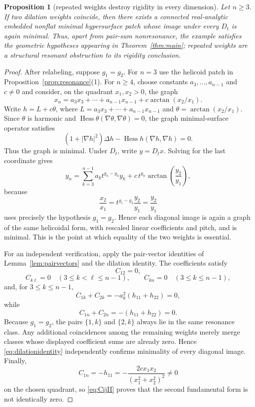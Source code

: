 \documentclass[10pt,a4paper]{amsart}
\newtheorem{proposition}{Proposition}
\begin{document}
\begin{proposition}[repeated weights destroy rigidity in every dimension]\label{prop:repeatedweights}
Let $n\ge3$. If two dilation weights coincide, then there exists a connected real-analytic embedded nonflat minimal hypersurface patch whose image under every $D_t$ is again minimal. Thus, apart from pair-sum nonresonance, the example satisfies the geometric hypotheses appearing in Theorem~\ref{thm:main}; repeated weights are a structural resonant obstruction to its rigidity conclusion.
\end{proposition}

\begin{proof}
After relabeling, suppose $g_1=g_2$. For $n=3$ use the helicoid patch in Proposition~\ref{prop:resonance}(1). For $n\ge4$, choose constants $a_3,\ldots,a_{n-1}$ and $c\ne0$ and consider, on the quadrant $x_1,x_2>0$, the graph
\begin{equation}\label{eq:shearedhelicoid}
x_n=a_3x_3+\cdots+a_{n-1}x_{n-1}+c\arctan(x_2/x_1).
\end{equation}
Write $h=L+c\theta$, where $L=a_3x_3+\cdots+a_{n-1}x_{n-1}$ and $\theta=\arctan(x_2/x_1)$. Since $\theta$ is harmonic and $\operatorname{Hess}\theta(\nabla\theta,\nabla\theta)=0$, the graph minimal-surface operator satisfies
\[
(1+|\nabla h|^2)\Delta h-\operatorname{Hess}h(\nabla h,\nabla h)=0.
\]
Thus the graph is minimal. Under $D_t$, write $y=D_tx$. Solving for the last coordinate gives
\[
y_n=\sum_{k=3}^{n-1}a_k t^{g_n-g_k}y_k+c\,t^{g_n}\arctan\!\left(\frac{y_2}{y_1}\right),
\]
because
\[
\frac{x_2}{x_1}=t^{g_1-g_2}\frac{y_2}{y_1}=\frac{y_2}{y_1}
\]
uses precisely the hypothesis $g_1=g_2$. Hence each diagonal image is again a graph of the same helicoidal form, with rescaled linear coefficients and pitch, and is minimal. This is the point at which equality of the two weights is essential.

For an independent verification, apply the pair-vector identities of Lemma~\ref{lem:pairvectors} and the dilation identity. The coefficients satisfy
\[
C_{12}=0,
\]
\[
C_{k\ell}=0\quad(3\le k<\ell\le n-1),\qquad
C_{kn}=0\quad(3\le k\le n-1),
\]
and, for $3\le k\le n-1$,
\[
C_{1k}+C_{2k}=-a_k^2(h_{11}+h_{22})=0,
\]
while
\[
C_{1n}+C_{2n}=-(h_{11}+h_{22})=0.
\]
Because $g_1=g_2$, the pairs $\{1,k\}$ and $\{2,k\}$ always lie in the same resonance class. Any additional coincidences among the remaining weights merely merge classes whose displayed coefficient sums are already zero. Hence \eqref{eq:dilationidentity} independently confirms minimality of every diagonal image. Finally,
\[
C_{1n}=-h_{11}=-\frac{2cx_1x_2}{(x_1^2+x_2^2)^2}\ne0
\]
on the chosen quadrant, so \eqref{eq:CijII} proves that the second fundamental form is not identically zero.
\end{proof}
\end{document}
